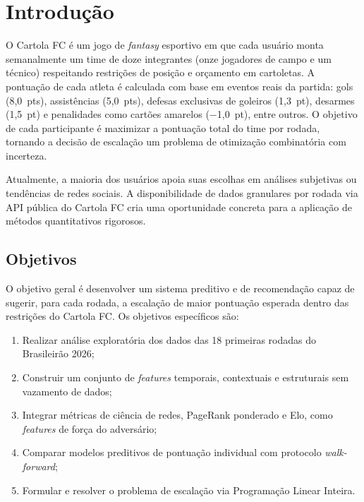 \documentclass[12pt, a4paper, oneside]{article}
\begin{document}
\section{Introdução}
\label{sec:intro}

O Cartola FC é um jogo de \textit{fantasy} esportivo em que cada usuário monta
semanalmente um time de doze integrantes (onze jogadores de campo e um técnico)
respeitando restrições de posição e orçamento em cartoletas. A pontuação de cada atleta
é calculada com base em eventos reais da partida: gols (8,0~pts), assistências (5,0~pts),
defesas exclusivas de goleiros (1,3~pt), desarmes (1,5~pt) e penalidades como cartões
amarelos ($-$1,0~pt), entre outros. O objetivo de cada participante é maximizar a
pontuação total do time por rodada, tornando a decisão de escalação um problema de
otimização combinatória com incerteza.

Atualmente, a maioria dos usuários apoia suas escolhas em análises subjetivas ou
tendências de redes sociais. A disponibilidade de dados granulares por rodada via API
pública do Cartola FC cria uma oportunidade concreta para a aplicação de métodos
quantitativos rigorosos.

\subsection{Objetivos}

O objetivo geral é desenvolver um sistema preditivo e de recomendação capaz de sugerir,
para cada rodada, a escalação de maior pontuação esperada dentro das restrições do
Cartola FC. Os objetivos específicos são:

\begin{enumerate}[leftmargin=*, label=(\roman*)]
  \item Realizar análise exploratória dos dados das 18 primeiras rodadas do Brasileirão 2026;
  \item Construir um conjunto de \textit{features} temporais, contextuais e estruturais
        sem vazamento de dados;
  \item Integrar métricas de ciência de redes, PageRank ponderado e Elo, como
        \textit{features} de força do adversário;
  \item Comparar modelos preditivos de pontuação individual com protocolo
        \textit{walk-forward};
  \item Formular e resolver o problema de escalação via Programação Linear Inteira.
\end{enumerate}
\end{document}
